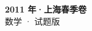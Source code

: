 \documentclass[zihao=-4, a4paper]{ctexart}
\begin{document}
\begin{center}
  {\Large\bfseries 2011 年·上海春季卷}\\[4pt]
  {\large 数学 · 试题版}
\end{center}
\medskip
{}

\end{document}
